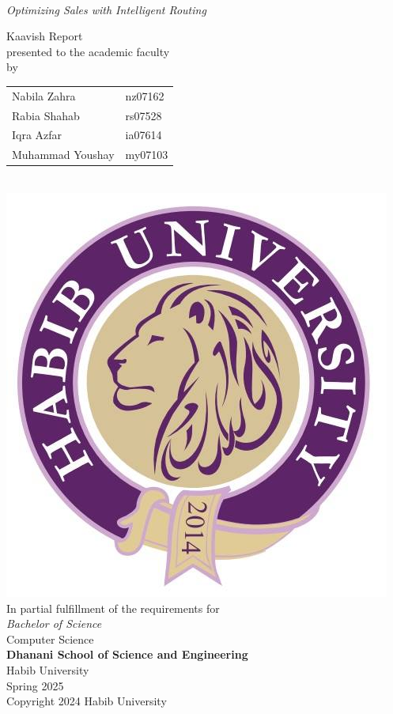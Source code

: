 \begin{titlepage}
  
  \begin{center}
    \vfill
    \textbf{\Huge \Title} \\
    {\Large \textit{Optimizing Sales with Intelligent Routing}}


    \bigskip
   
    {\large Kaavish Report\\
      presented to the academic faculty\\
      by\\\bigskip
      \begin{tabular}{ll}
        Nabila Zahra & nz07162\\
        Rabia Shahab & rs07528\\
        Iqra Azfar & ia07614\\
        Muhammad Youshay & my07103\\
      \end{tabular}
    }\\\bigskip\bigskip\bigskip
    \includegraphics[width=.4\textwidth]{images/HU.jpg}\\
    {\large In partial fulfillment of the requirements for\\
      \textit{Bachelor of Science}\\
      Computer Science\\\medskip
      \textbf{Dhanani School of Science and Engineering}\\\medskip
      Habib University\\\smallskip
      Spring 2025
    }\\\vfill
    Copyright {\scriptsize \textcopyright} 2024 Habib University
  \end{center}
  \restoregeometry
\end{titlepage}

